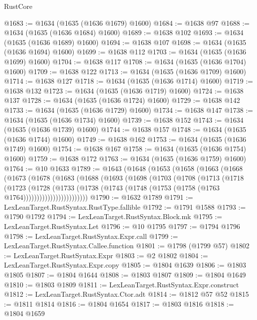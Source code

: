 \begin{lexlean}{RustCore}
\begin{coremodule}
@1683 := @1634 (@1635 (@1636 @1679) @1600)
@1684 := @1638 @97
@1688 := @1634 (@1635 (@1636 @1684) @1600)
@1689 := @1638 @102
@1693 := @1634 (@1635 (@1636 @1689) @1600)
@1694 := @1638 @107
@1698 := @1634 (@1635 (@1636 @1694) @1600)
@1699 := @1638 @112
@1703 := @1634 (@1635 (@1636 @1699) @1600)
@1704 := @1638 @117
@1708 := @1634 (@1635 (@1636 @1704) @1600)
@1709 := @1638 @122
@1713 := @1634 (@1635 (@1636 @1709) @1600)
@1714 := @1638 @127
@1718 := @1634 (@1635 (@1636 @1714) @1600)
@1719 := @1638 @132
@1723 := @1634 (@1635 (@1636 @1719) @1600)
@1724 := @1638 @137
@1728 := @1634 (@1635 (@1636 @1724) @1600)
@1729 := @1638 @142
@1733 := @1634 (@1635 (@1636 @1729) @1600)
@1734 := @1638 @147
@1738 := @1634 (@1635 (@1636 @1734) @1600)
@1739 := @1638 @152
@1743 := @1634 (@1635 (@1636 @1739) @1600)
@1744 := @1638 @157
@1748 := @1634 (@1635 (@1636 @1744) @1600)
@1749 := @1638 @162
@1753 := @1634 (@1635 (@1636 @1749) @1600)
@1754 := @1638 @167
@1758 := @1634 (@1635 (@1636 @1754) @1600)
@1759 := @1638 @172
@1763 := @1634 (@1635 (@1636 @1759) @1600)
@1764 := @10 @1633
@1789 := @1643
    (@1648
      (@1653
        (@1658
          (@1663
            (@1668
              (@1673
                (@1678
                  (@1683
                    (@1688
                      (@1693
                        (@1698
                          (@1703
                            (@1708
                              (@1713
                                (@1718
                                  (@1723
                                    (@1728
                                      (@1733
                                        (@1738
                                          (@1743
                                            (@1748
                                              (@1753 (@1758 (@1763 @1764))))))))))))))))))))))))
@1790 := @1632 @1789
@1791 := LexLeanTarget.RustSyntax.RustType.fallible
@1792 := @1791 @1588
@1793 := @1790 @1792
@1794 := LexLeanTarget.RustSyntax.Block.mk
@1795 := LexLeanTarget.RustSyntax.Let
@1796 := @10 @1795
@1797 := @1794 @1796
@1798 := LexLeanTarget.RustSyntax.Expr.call
@1799 := LexLeanTarget.RustSyntax.Callee.function
@1801 := @1798 (@1799 @57)
@1802 := LexLeanTarget.RustSyntax.Expr
@1803 := @2 @1802
@1804 := LexLeanTarget.RustSyntax.Expr.copy
@1805 := @1804 @1639
@1806 := @1803 @1805
@1807 := @1804 @1644
@1808 := @1803 @1807
@1809 := @1804 @1649
@1810 := @1803 @1809
@1811 := LexLeanTarget.RustSyntax.Expr.construct
@1812 := LexLeanTarget.RustSyntax.Ctor.adt
@1814 := @1812 @57 @52
@1815 := @1811 @1814
@1816 := @1804 @1654
@1817 := @1803 @1816
@1818 := @1804 @1659

\end{coremodule}
\end{lexlean}
